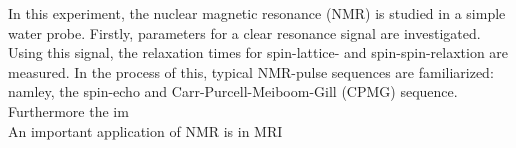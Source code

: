 \documentclass[../main.tex]{subfiles}
\begin{document}

In this experiment, the nuclear magnetic resonance (NMR) is studied in a simple water probe. Firstly, parameters for a clear resonance signal are investigated. Using this signal, the relaxation times for spin-lattice- and spin-spin-relaxtion are measured. In the process of this, typical NMR-pulse sequences are familiarized: namley, the spin-echo and Carr-Purcell-Meiboom-Gill (CPMG) sequence. Furthermore the im\\

An important application of NMR is in MRI
\end{document}
